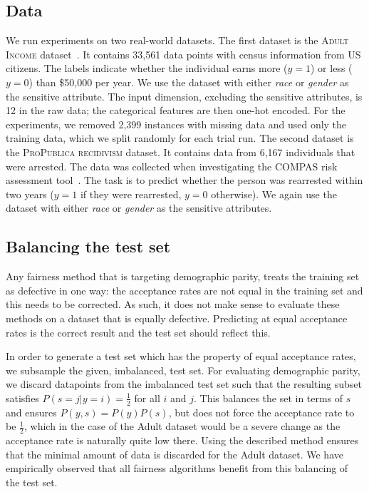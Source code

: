 \subsection{Data}
We run experiments on two real-world datasets.
The first dataset is the \textsc{Adult Income} dataset~\citep{Dua:2017}.
It contains 33,561 data points with census information from US citizens.
The labels indicate whether the individual earns more ($y=1$) or less ($y=0$) than \$50,000 per year.
We use the dataset with either \emph{race} or \emph{gender} as the sensitive attribute.
The input dimension, excluding the sensitive attributes, is 12 in the raw data;
the categorical features are then one-hot encoded.
For the experiments, we removed 2,399 instances with missing data
and used only the training data, which we split randomly for each trial run.
%
The second dataset is the \textsc{ProPublica recidivism} dataset.
It contains data from 6,167 individuals that were arrested.
The data was collected when investigating the COMPAS risk assessment tool~\citep{angwin2016machine}.
The task is to predict whether the person was rearrested within two years
($y=1$ if they were rearrested, $y=0$ otherwise).
We again use the dataset with either \emph{race} or \emph{gender} as the sensitive attributes.

\subsection{Balancing the test set}
Any fairness method that is targeting demographic parity, treats the training set as defective in one way:
the acceptance rates are not equal in the training set and this needs to be corrected.
As such, it does not make sense to evaluate these methods on a dataset that is equally defective.
Predicting at equal acceptance rates is the correct result and the test set should reflect this.

In order to generate a test set which has the property of equal acceptance rates,
we subsample the given, imbalanced, test set.
For evaluating demographic parity,
we discard datapoints from the imbalanced test set such that the resulting subset satisfies $P(s=j|y=i)=\tfrac{1}{2}$ for all $i$ and $j$.
This balances the set in terms of $s$ and ensures $P(y,s)=P(y)P(s)$,
but does not force the acceptance rate to be $\tfrac{1}{2}$,
which in the case of the Adult dataset would be a severe change as the acceptance rate is naturally quite low there.
Using the described method ensures that the minimal amount of data is discarded for the Adult dataset.
We have empirically observed that all fairness algorithms benefit from this balancing of the test set.

